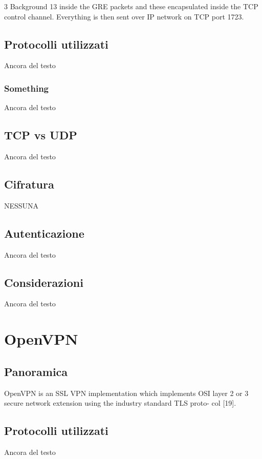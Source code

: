 3 Background 13
inside the GRE packets and these encapsulated inside the TCP control channel. Everything is then sent over IP network on TCP port 1723.
\subsection{Protocolli utilizzati}
Ancora del testo

\subsubsection{Something}
Ancora del testo

\subsection{TCP vs UDP}
Ancora del testo

\subsection{Cifratura}
NESSUNA

\subsection{Autenticazione}
Ancora del testo

\subsection{Considerazioni}
Ancora del testo

\section{OpenVPN}
\subsection{Panoramica}
OpenVPN is an SSL VPN implementation which implements OSI layer 2 or 3 secure network extension using the industry standard TLS proto- col [19].

\subsection{Protocolli utilizzati}
Ancora del testo

